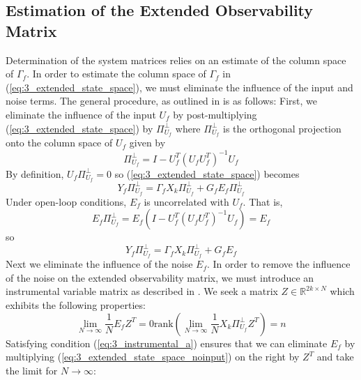 \subsection{Estimation of the Extended Observability Matrix}\label{sec:estimation_of_the_extended_observability_matrix}
Determination of the system matrices relies on an estimate of the column space of $\Gamma_f$. In order to estimate the column space of $\Gamma_f$ in (\ref{eq:3_extended_state_space}), we must eliminate the influence of the input and noise terms. The general procedure, as outlined in \cite{qin2006overview, verhaegen2007filtering} is as follows: First, we eliminate the influence of the input $U_f$ by post-multiplying (\ref{eq:3_extended_state_space}) by $\Pi_{U_f}^\perp$ where $\Pi_{U_f}^\perp$ is the orthogonal projection onto the column space of $U_f$ given by
\begin{equation*}
\Pi_{U_f}^\perp = I - U_f^T(U_f U_f^T)^{-1}U_f
\end{equation*}
By definition, $U_f\Pi_{U_f}^\perp = 0$ so (\ref{eq:3_extended_state_space}) becomes
\begin{equation}
Y_f\Pi_{U_f}^\perp = \Gamma_f X_k\Pi_{U_f}^\perp + G_f E_f\Pi_{U_f}^\perp
\end{equation}
Under open-loop conditions, $E_f$ is uncorrelated with $U_f$. That is,
\begin{equation*}
E_f \Pi_{U_f}^\perp = E_f(I-U_f^T(U_fU_f^T)^{-1}U_f) = E_f
\end{equation*}
so
\begin{equation}\label{eq:3_extended_state_space_noinput}
Y_f\Pi_{U_f}^\perp = \Gamma_f X_k\Pi_{U_f}^\perp + G_f E_f
\end{equation}
Next we eliminate the influence of the noise $E_f$. In order to remove the influence of the noise on the extended observability matrix, we must introduce an instrumental variable matrix as described in \cite{verhaegen2007filtering}. We seek a matrix $Z \in \mathbb{R}^{2k\times N}$ which exhibits the following properties:
\begin{subequations}\begin{equation}\label{eq:3_instrumental_a}
\lim_{N\rightarrow\infty} \frac{1}{N} E_f Z^T = 0
\end{equation}
\begin{equation}\label{eq:3_instrumental_b}
\mbox{rank}\left(\lim_{N\rightarrow\infty} \frac{1}{N} X_k \Pi_{U_f}^\perp Z^T\right) = n
\end{equation}
\end{subequations}
Satisfying condition (\ref{eq:3_instrumental_a}) ensures that we can eliminate $E_f$ by multiplying (\ref{eq:3_extended_state_space_noinput}) on the right by $Z^T$ and take the limit for $N\rightarrow\infty$:
